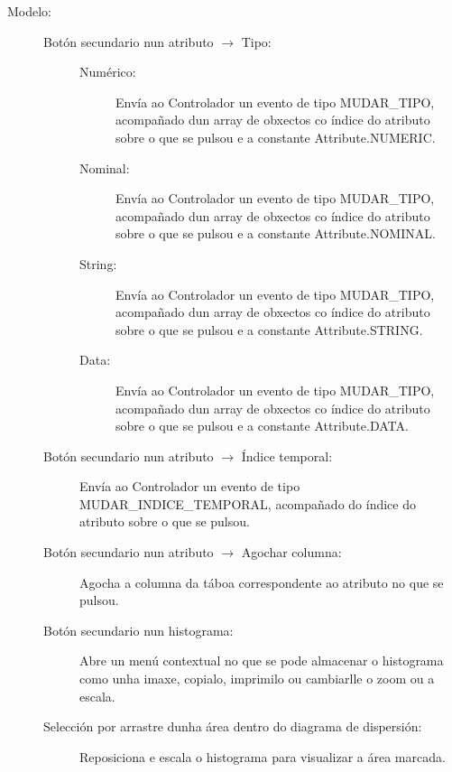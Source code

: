 \begin{description}

\item[Modelo:] \hfill

\begin{description}

\item[Botón secundario nun atributo $\rightarrow$ Tipo:] \hfill

\begin{description}

\item[Numérico:] \hfill
Envía ao Controlador un evento de tipo MUDAR\_TIPO, acompañado dun array de obxectos co índice do atributo sobre o que se pulsou e a constante Attribute.NUMERIC.

\item[Nominal:] \hfill
Envía ao Controlador un evento de tipo MUDAR\_TIPO, acompañado dun array de obxectos co índice do atributo sobre o que se pulsou e a constante Attribute.NOMINAL.

\item[String:] \hfill
Envía ao Controlador un evento de tipo MUDAR\_TIPO, acompañado dun array de obxectos co índice do atributo sobre o que se pulsou e a constante Attribute.STRING.

\item[Data:] \hfill
Envía ao Controlador un evento de tipo MUDAR\_TIPO, acompañado dun array de obxectos co índice do atributo sobre o que se pulsou e a constante Attribute.DATA.

\end{description}

\item[Botón secundario nun atributo $\rightarrow$ Índice temporal:] \hfill
Envía ao Controlador un evento de tipo MUDAR\_INDICE\_TEMPORAL, acompañado do índice do atributo sobre o que se pulsou.

\item[Botón secundario nun atributo $\rightarrow$ Agochar columna:] \hfill
Agocha a columna da táboa correspondente ao atributo no que se pulsou.

\item[Botón secundario nun histograma:] \hfill
Abre un menú contextual no que se pode almacenar o histograma como unha imaxe, copialo, imprimilo ou cambiarlle o zoom ou a escala.

\item[Selección por arrastre dunha área dentro do diagrama de dispersión:] \hfill
Reposiciona e escala o histograma para visualizar a área marcada.


\end{description}
\end{description}

